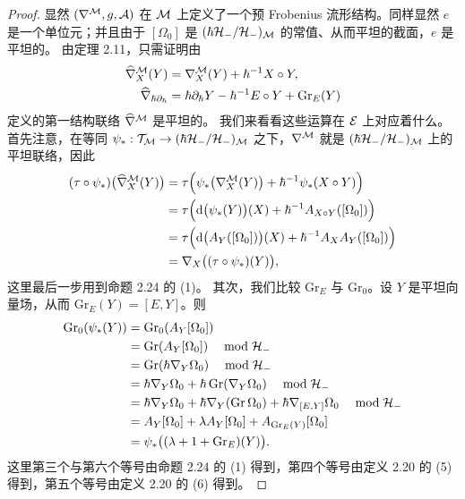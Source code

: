 \begin{proof}
显然 $(\nabla^{\mathcal{M}},g,\mathcal{A})$ 在 $\mathcal{M}$ 上定义了一个预 Frobenius 流形结构。同样显然 $e$ 是一个单位元；并且由于 $[\Omega_0]$ 是 $(\hbar\mathcal{H}_-/\mathcal{H}_-)_{\mathcal{M}}$ 的常值、从而平坦的截面，$e$ 是平坦的。
由定理 2.11，只需证明由
\begin{align*}
\widehat{\nabla}^{\mathcal{M}}_X(Y)&=\nabla^{\mathcal{M}}_X(Y)+\hbar^{-1}X\circ Y,\\
\widehat{\nabla}_{\hbar\partial_\hbar}&=\hbar\partial_\hbar Y-\hbar^{-1}E\circ Y+\mathrm{Gr}_E(Y)
\end{align*}
定义的第一结构联络 $\widehat{\nabla}^{\mathcal{M}}$ 是平坦的。
我们来看看这些运算在 $\mathcal{E}$ 上对应着什么。首先注意，在等同 $\psi_*:\mathcal{T}_{\mathcal{M}}\to(\hbar\mathcal{H}_-/\mathcal{H}_-)_{\mathcal{M}}$ 之下，$\nabla^{\mathcal{M}}$ 就是 $(\hbar\mathcal{H}_-/\mathcal{H}_-)_{\mathcal{M}}$ 上的平坦联络，因此
\begin{align*}
(\tau\circ\psi_*)\bigl(\widehat{\nabla}^{\mathcal{M}}_X(Y)\bigr)
&=\tau\Bigl(\psi_*\bigl(\nabla^{\mathcal{M}}_X(Y)\bigr)+\hbar^{-1}\psi_*(X\circ Y)\Bigr)\\
&=\tau\Bigl(\mathrm{d}\bigl(\psi_*(Y)\bigr)(X)+\hbar^{-1}A_{X\circ Y}([\Omega_0])\Bigr)\\
&=\tau\Bigl(\mathrm{d}\bigl(A_Y([\Omega_0])\bigr)(X)+\hbar^{-1}A_XA_Y([\Omega_0])\Bigr)\\
&=\nabla_X\bigl((\tau\circ\psi_*)(Y)\bigr),
\end{align*}
这里最后一步用到命题 2.24 的 (1)。
其次，我们比较 $\mathrm{Gr}_E$ 与 $\mathrm{Gr}_0$。设 $Y$ 是平坦向量场，从而 $\mathrm{Gr}_E(Y)=[E,Y]$。则
\begin{align*}
\mathrm{Gr}_0(\psi_*(Y))&=\mathrm{Gr}_0(A_Y[\Omega_0])\\
&=\mathrm{Gr}(A_Y[\Omega_0])\quad\bmod\mathcal{H}_-\\
&=\mathrm{Gr}(\hbar\nabla_Y\Omega_0)\quad\bmod\mathcal{H}_-\\
&=\hbar\nabla_Y\Omega_0+\hbar\,\mathrm{Gr}(\nabla_Y\Omega_0)\quad\bmod\mathcal{H}_-\\
&=\hbar\nabla_Y\Omega_0+\hbar\nabla_Y(\mathrm{Gr}\,\Omega_0)+\hbar\nabla_{[E,Y]}\Omega_0\quad\bmod\mathcal{H}_-\\
&=A_Y[\Omega_0]+\lambda A_Y[\Omega_0]+A_{\mathrm{Gr}_E(Y)}[\Omega_0]\\
&=\psi_*\bigl((\lambda+1+\mathrm{Gr}_E)(Y)\bigr).
\end{align*}
这里第三个与第六个等号由命题 2.24 的 (1) 得到，第四个等号由定义 2.20 的 (5) 得到，第五个等号由定义 2.20 的 (6) 得到。


\end{proof}
